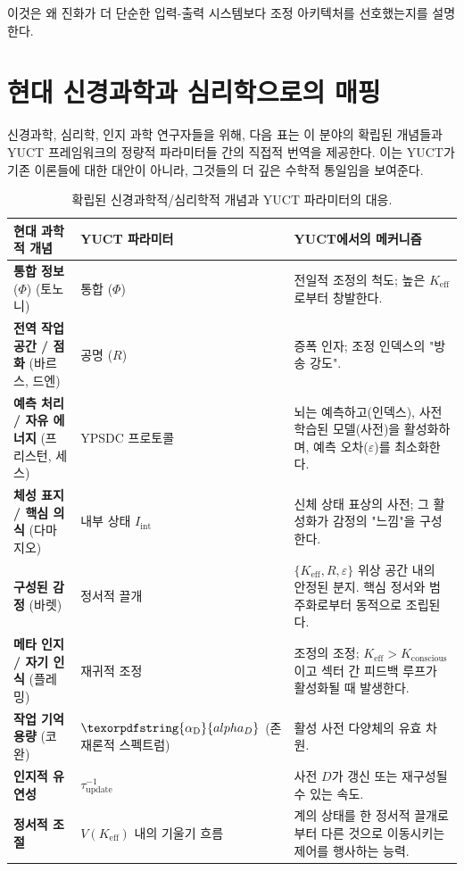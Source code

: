 \documentclass[12pt,a4paper]{article}
\DeclareRobustCommand{\alD}{\texorpdfstring{\ensuremath{\alpha_{\mathrm{D}}}}{alpha_D}}
\begin{document}
	이것은 왜 진화가 더 단순한 입력-출력 시스템보다 조정 아키텍처를 선호했는지를 설명한다.
	
	\section{현대 신경과학과 심리학으로의 매핑}
	
	신경과학, 심리학, 인지 과학 연구자들을 위해, 다음 표는 이 분야의 확립된 개념들과 YUCT 프레임워크의 정량적 파라미터들 간의 직접적 번역을 제공한다. 이는 YUCT가 기존 이론들에 대한 대안이 아니라, 그것들의 더 깊은 수학적 통일임을 보여준다.
	
	\begin{table}[H]
		\centering
		\caption{확립된 신경과학적/심리학적 개념과 YUCT 파라미터의 대응.}
		\label{tab:mapping}
		\begin{tabular}{p{4.5cm} p{4cm} p{5cm}}
			\toprule
			\textbf{현대 과학적 개념} & \textbf{YUCT 파라미터} & \textbf{YUCT에서의 메커니즘} \\
			\midrule
			\textbf{통합 정보} (\(\Phi\)) (토노니) & 통합 (\(\Phi\)) & 전일적 조정의 척도; 높은 \(K_{\mathrm{eff}}\)로부터 창발한다. \\
			\textbf{전역 작업 공간 / 점화} (바르스, 드엔) & 공명 (\(R\)) & 증폭 인자; 조정 인덱스의 "방송 강도". \\
			\textbf{예측 처리 / 자유 에너지} (프리스턴, 세스) & YPSDC 프로토콜 & 뇌는 예측하고(인덱스), 사전 학습된 모델(사전)을 활성화하며, 예측 오차(\(\varepsilon\))를 최소화한다. \\
			\textbf{체성 표지 / 핵심 의식} (다마지오) & 내부 상태 \(I_{\mathrm{int}}\) & 신체 상태 표상의 사전; 그 활성화가 감정의 "느낌"을 구성한다. \\
			\textbf{구성된 감정} (바렛) & 정서적 끌개 & \(\{K_{\mathrm{eff}}, R, \varepsilon\}\) 위상 공간 내의 안정된 분지. 핵심 정서와 범주화로부터 동적으로 조립된다. \\
			\textbf{메타 인지 / 자기 인식} (플레밍) & 재귀적 조정 & 조정의 조정; \(K_{\mathrm{eff}} > K_{\mathrm{conscious}}\)이고 섹터 간 피드백 루프가 활성화될 때 발생한다. \\
			\textbf{작업 기억 용량} (코완) & \(\alD\) (존재론적 스펙트럼) & 활성 사전 다양체의 유효 차원. \\
			\textbf{인지적 유연성} & \(\tau_{\mathrm{update}}^{-1}\) & 사전 \(D\)가 갱신 또는 재구성될 수 있는 속도. \\
			\textbf{정서적 조절} & \(V(K_{\mathrm{eff}})\) 내의 기울기 흐름 & 계의 상태를 한 정서적 끌개로부터 다른 것으로 이동시키는 제어를 행사하는 능력. \\
			\bottomrule
		\end{tabular}
	\end{table}
	
\end{document}
